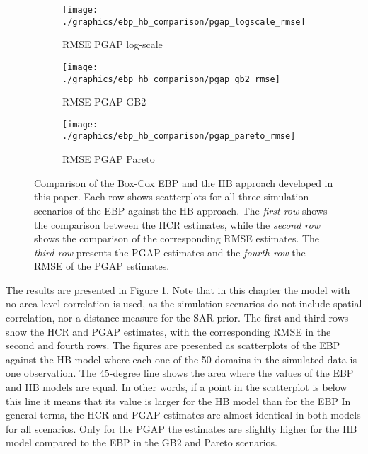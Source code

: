 \begin{figure}
    \begin{subfigure}{0.31\linewidth}
        \centering
        \texttt{[image: ./graphics/ebp\_hb\_comparison/pgap\_logscale\_rmse]}
        \caption{RMSE PGAP log-scale}
    \end{subfigure}
    \begin{subfigure}{0.31\linewidth}
        \centering
        \texttt{[image: ./graphics/ebp\_hb\_comparison/pgap\_gb2\_rmse]}
        \caption{RMSE PGAP GB2}
    \end{subfigure}
    \begin{subfigure}{0.31\linewidth}
        \centering
        \texttt{[image: ./graphics/ebp\_hb\_comparison/pgap\_pareto\_rmse]}
        \caption{RMSE PGAP Pareto}
    \end{subfigure}
    \caption[Comparison of EBP and HB approaches with simulated data.]{Comparison of the Box-Cox EBP and the HB approach developed in this paper. Each row shows scatterplots for all three simulation scenarios of the EBP against the HB approach. The \textit{first row} shows the comparison between the HCR estimates, while the \textit{second row} shows the comparison of the corresponding RMSE estimates. The \textit{third row} presents the PGAP estimates and the \textit{fourth row} the RMSE of the PGAP estimates.}
    \label{fig:ebp_hb_comparison}
\end{figure}

The results are presented in Figure \ref{fig:ebp_hb_comparison}.
Note that in this chapter the model with no area-level correlation is used, as the simulation scenarios do not include spatial correlation, nor a distance measure for the SAR prior.
The first and third rows show the HCR and PGAP estimates, with the corresponding RMSE in the second and fourth rows.
The figures are presented as scatterplots of the EBP against the HB model where each one of the 50 domains in the simulated data is one observation.
The 45-degree line shows the area where the values of the EBP and HB models are equal.
In other words, if a point in the scatterplot is below this line it means that its value is larger for the HB model than for the EBP
In general terms, the HCR and PGAP estimates are almost identical in both models for all scenarios.
Only for the PGAP the estimates are slighlty higher for the HB model compared to the EBP in the GB2 and Pareto scenarios.


